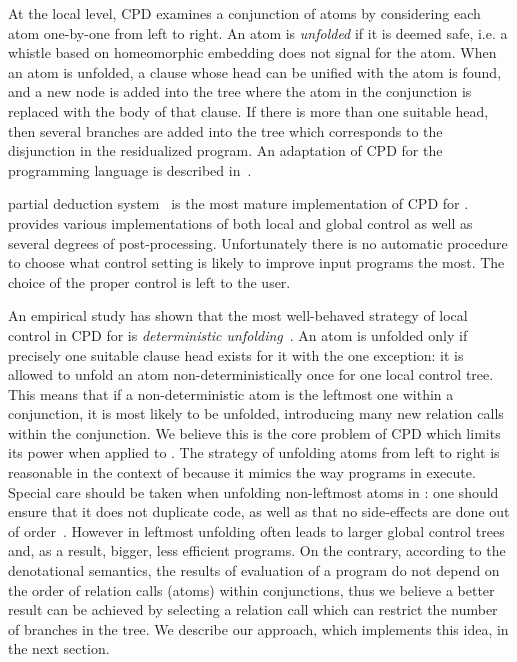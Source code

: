At the local level, CPD examines a conjunction of atoms by considering each atom one-by-one from left to right.
An atom is \emph{unfolded} if it is deemed safe, i.e. a whistle based on homeomorphic embedding does not signal for the atom.
When an atom is unfolded, a clause whose head can be unified with the atom is found, and a new node is added into the tree where the atom in the conjunction is replaced with the body of that clause.
If there is more than one suitable head, then several branches are added into the tree which corresponds to the disjunction in the residualized program.
An adaptation of CPD for the \mk programming language is described in~\cite{lozov2019relational}.

\ecce partial deduction system~\cite{leuschel1997ecce} is the most mature implementation of CPD for \pro.
\ecce provides various implementations of both local and global control as well as several degrees of post-processing.
Unfortunately there is no automatic procedure to choose what control setting is likely to improve input programs the most.
The choice of the proper control is left to the user.

An empirical study has shown that the most well-behaved strategy of local control in CPD for \pro is \emph{deterministic unfolding}~\cite{leuschel1997advanced}.
An atom is unfolded only if precisely one suitable clause head exists for it with the one exception: it is allowed to unfold an atom non-deterministically once for one local control tree.
This means that if a non-deterministic atom is the leftmost one within a conjunction, it is most likely to be unfolded, introducing many new relation calls within the conjunction.
We believe this is the core problem of CPD which limits its power when applied to \mk.
The strategy of unfolding atoms from left to right is reasonable in the context of \pro because it mimics the way programs in \pro execute.
Special care should be taken when unfolding non-leftmost atoms in \pro: one should ensure that it does not duplicate code, as well as that no side-effects are done out of order~\cite{nonleftmost, leuschel2014fast}.
However in \mk leftmost unfolding often leads to larger global control trees and, as a result, bigger, less efficient programs.
On the contrary, according to the denotational semantics, the results of evaluation of a \mk program do not depend on the order of relation calls (atoms) within conjunctions, thus we believe a better result can be achieved by selecting a relation call which can restrict the number of branches in the tree.
We describe our approach, which implements this idea, in the next section.
